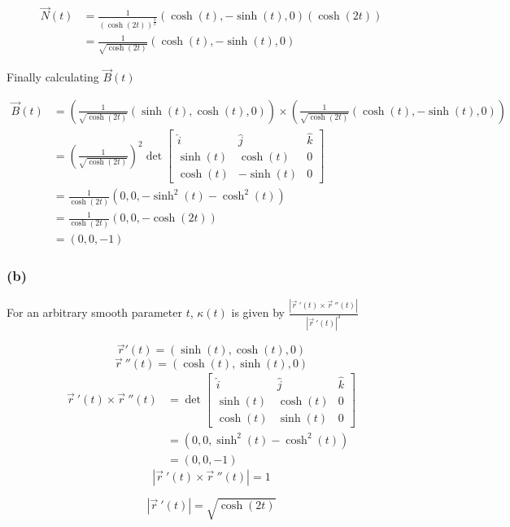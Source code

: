 \documentclass{article}
\begin{document}
\begin{align*}
    \vec{N}(t) &= \frac{1}{(\cosh(2t))^{\frac{3}{2}}} (\cosh(t), -\sinh(t), 0) (\cosh(2t))
    \\ 
    &= \frac{1}{\sqrt{\cosh(2t)}} (\cosh(t), -\sinh(t), 0)
\end{align*}

Finally calculating \(\vec{B}(t)\)

\begin{align*}
    \vec{B}(t) &= \left(\frac{1}{\sqrt{\cosh(2t)}}(\sinh(t), \cosh(t), 0)\right) \times \left(\frac{1}{\sqrt{\cosh(2t)}} (\cosh(t), -\sinh(t), 0)\right)
    \\
    &= \left(\frac{1}{\sqrt{\cosh(2t)}}\right)^2 \det \begin{bmatrix}
        \hat{i} & \hat{j} & \hat{k} \\
        \sinh(t) & \cosh(t) & 0 \\
        \cosh(t) & -\sinh(t) & 0
    \end{bmatrix}
    \\
    &= \frac{1}{\cosh(2t)} (0, 0, -\sinh^2(t) -\cosh^2(t))
    \\
    &= \frac{1}{\cosh(2t)} (0, 0, -\cosh(2t))
    \\
    &= (0,0,-1)
\end{align*}

\subsubsection*{(b)}
For an arbitrary smooth parameter \(t\), \(\kappa(t)\) is given by \(\frac{|\vec{r}\ '(t) \times \vec{r}\ ''(t)|}{|\vec{r}\ '(t)|^3}\)

\[
\vec{r} '(t) = (\sinh(t), \cosh(t), 0)
\]
\[
\vec{r}\ ''(t) = (\cosh(t), \sinh(t), 0)
\]
\begin{align*}
    \vec{r}\ '(t) \times \vec{r}\ ''(t) &= \det \begin{bmatrix}
        \hat{i} & \hat{j} & \hat{k} \\
        \sinh(t) & \cosh(t) & 0 \\
        \cosh(t) & \sinh(t) & 0
    \end{bmatrix}
    \\
    &= (0,0, \sinh^2(t) - \cosh^2(t))
    \\
    &= (0,0, -1)
\end{align*}
\[
|\vec{r}\ '(t) \times \vec{r}\ ''(t)| = 1
\]

\[
|\vec{r} \ ' (t)| = \sqrt{\cosh(2t)}
\]
\end{document}
